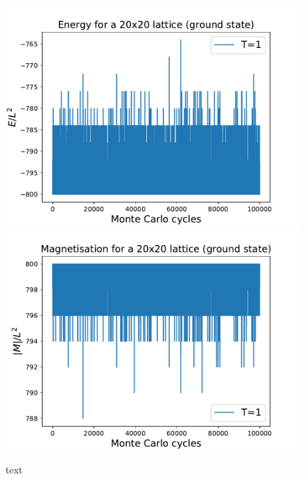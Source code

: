 \documentclass{emulateapj}
\begin{document}
\begin{figure}[H]
{{\includegraphics[scale=0.53]{EofMCC-GS-T1-L20-1e5.pdf}}
}\qquad
{{\includegraphics[scale=0.53]{MofMCC-GS-T1-L20-1e5.pdf}}
}\qquad
\caption{text}
\label{fig:GS}
\end{figure}
\end{document}
